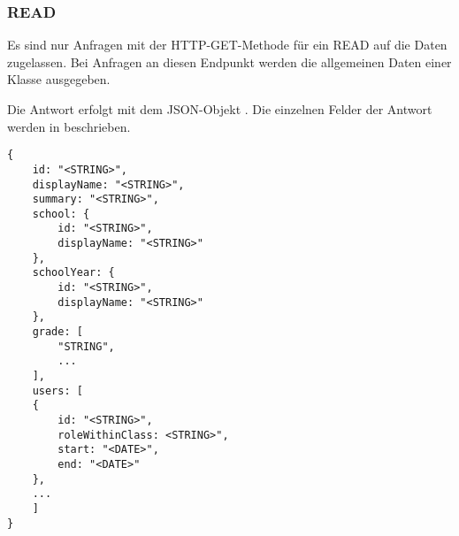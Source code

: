\subsubsection{READ}
\label{sec:rest:api:classes:id:read}
Es sind nur Anfragen mit der HTTP-GET-Methode für ein READ auf die Daten zugelassen.
Bei Anfragen an diesen Endpunkt werden die allgemeinen Daten einer Klasse ausgegeben.

Die Antwort erfolgt mit dem JSON-Objekt . 
Die einzelnen Felder der Antwort werden in  beschrieben.

\begin{lstlisting}[caption={JSON-Antwort für einen GET-Aufruf des Pfads /api/classes/\$id},label={lst:code:rest:api:classes:id:read:ret},frame=tlrb]
{
    id: "<STRING>",
    displayName: "<STRING>",
    summary: "<STRING>",
    school: {
        id: "<STRING>",
        displayName: "<STRING>"
    },
    schoolYear: {
        id: "<STRING>",
        displayName: "<STRING>"
    },
    grade: [
        "STRING",
        ...
    ],
    users: [
    {
        id: "<STRING>",
        roleWithinClass: <STRING>",
        start: "<DATE>",
        end: "<DATE>"    
    },
    ...
    ]
}
\end{lstlisting}

